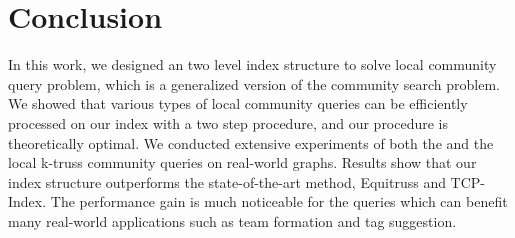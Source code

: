 \section{Conclusion}
\label{conclusion}

In this work, we designed an two level index structure to solve local community query problem, which is a generalized version of the community search problem. We showed that various types of local community queries can be efficiently processed on our index with a two step procedure, and our procedure is theoretically optimal. We conducted extensive experiments of both the \toplevelprob{} and the \bottomlevelprob{} local k-truss community queries on real-world graphs. Results show that our index structure outperforms the state-of-the-art method, Equitruss and TCP-Index. The performance gain is much noticeable for the \toplevelprob{} queries which can benefit many real-world applications such as team formation and tag suggestion.


